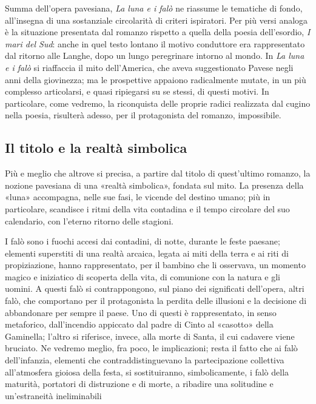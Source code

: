 \documentclass[a4paper, twoside, titlepage]{book}
\newcounter{mar}
\begin{document}
Summa dell'opera pavesiana, \textit{La luna e i falò} ne riassume le tematiche di fondo, all'insegna di una sostanziale circolarità di criteri ispiratori. Per più versi analoga è la situazione presentata dal romanzo rispetto a quella della poesia dell'esordio, \textit{I mari del Sud}: anche in quel testo lontano il motivo conduttore era rappresentato dal ritorno alle Langhe, dopo un lungo peregrinare intorno al mondo. In \textit{La luna e i falò} si riaffaccia il mito dell'America, che aveva suggestionato Pavese negli anni della giovinezza; ma le prospettive appaiono radicalmente mutate, in un più complesso articolarsi, e quasi ripiegarsi su se stessi, di questi motivi. In particolare, come vedremo, la riconquista delle proprie radici realizzata dal cugino nella poesia, risulterà adesso, per il protagonista del romanzo, impossibile.

\subsection{Il titolo e la realtà simbolica}

Più e meglio che altrove si precisa, a partire dal titolo di quest'ultimo romanzo, la nozione pavesiana di una «realtà simbolica», fondata sul mito. La presenza della «luna» accompagna, nelle sue fasi, le vicende del destino umano; più in particolare, scandisce i ritmi della vita contadina e il tempo circolare del suo calendario, con l'eterno ritorno delle stagioni.

I falò sono i fuochi accesi dai contadini, di notte, durante le feste paesane; elementi superstiti di una realtà arcaica, legata ai miti della terra e ai riti di propiziazione, hanno rappresentato, per il bambino che li osservava, un momento magico e iniziatico di scoperta della vita, di comunione con la natura e gli uomini. A questi falò si contrappongono, sul piano dei significati dell'opera, altri falò, che comportano per il protagonista la perdita delle illusioni e la decisione di abbandonare per sempre il paese. Uno di questi è rappresentato, in senso metaforico, dall'incendio appiccato dal padre di Cinto al «casotto» della Gaminella; l'altro si riferisce, invece, alla morte di Santa, il cui cadavere viene bruciato. Ne vedremo meglio, fra poco, le implicazioni; resta il fatto che ai falò dell'infanzia, elementi che contraddistinguevano la partecipazione collettiva all'atmosfera gioiosa della festa, si sostituiranno, simbolicamente, i falò della maturità, portatori di distruzione e di morte, a ribadire una solitudine e un'estraneità ineliminabili
\end{document}
